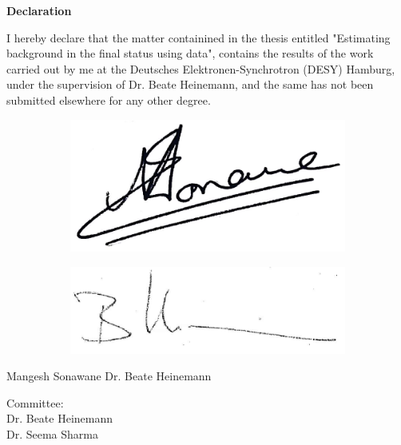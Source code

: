 \begin{center}
\Huge \textbf{Declaration\\}
\end{center}
\vspace{1cm}
\normalsize I hereby declare that the matter containined in the thesis entitled "Estimating \ZZ background in the \llM final status using \Zg data", contains the results of the work carried out by me at the Deutsches Elektronen-Synchrotron (DESY) Hamburg, under the supervision of Dr. Beate Heinemann, and the same has not been submitted elsewhere for any other degree.
\vfill
\begin{figure}[H]
	\hspace{1cm}
	\begin{subfigure}{0.49\textwidth}
	\includegraphics[width=0.4\linewidth]{sign.jpg}
	\end{subfigure}\hspace{1cm}
	\begin{subfigure}{0.49\textwidth}
	\centering
	\includegraphics[width=0.7\linewidth]{Beate_sign.jpg}
	\end{subfigure}
\end{figure}
\begin{center}
Mangesh Sonawane\hspace{8cm}
Dr. Beate Heinemann
\end{center}
\vfill
Committee:\\
Dr. Beate Heinemann\\
Dr. Seema Sharma
\vfill
\vfill
\newpage

